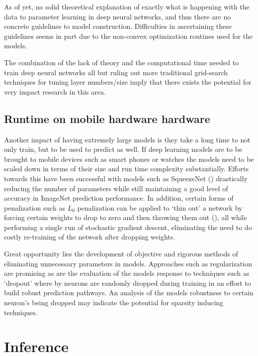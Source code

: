 \documentclass[]{book}
\theoremstyle{definition}
\theoremstyle{definition}
\theoremstyle{definition}
\theoremstyle{remark}
\begin{document}
As of yet, no solid theoretical explanation of exactly what is happening
with the data to parameter learning in deep neural networks, and thus
there are no concrete guidelines to model construction. Difficulties in
ascertaining these guidelines seems in part due to the non-convex
optimization routines used for the models.

The combination of the lack of theory and the computational time needed
to train deep neural networks all but ruling out more traditional
grid-search techniques for tuning layer numbers/size imply that there
exists the potential for very impact research in this area.

\subsection{Runtime on mobile hardware
hardware}\label{runtime-on-mobile-hardware-hardware}

Another impact of having extremely large models is they take a long time
to not only train, but to be used to predict as well. If deep learning
models are to be brought to mobile devices such as smart phones or
watches the models need to be scaled down in terms of their size and run
time complexity substantially. Efforts towards this have been successful
with models such as SqueezeNet (\citet{squeezenet}) drastically reducing
the number of parameters while still maintaining a good level of
accuracy in ImageNet prediction performance. In addition, certain forms
of penalization such as \(L_0\) penalization can be applied to `thin
out' a network by forcing certain weights to drop to zero and then
throwing them out (\citet{sparsenets}), all while performing a single
run of stochastic gradient descent, eliminating the need to do costly
re-training of the network after dropping weights.

Great opportunity lies the development of objective and rigorous methods
of eliminating unnecessary parameters in models. Approaches such as
regularization are promising as are the evaluation of the models
response to techniques such as `dropout' where by neurons are randomly
dropped during training in an effort to build robust prediction
pathways. An analysis of the models robustness to certain neuron's being
dropped may indicate the potential for sparsity inducing techniques.

\section{Inference}\label{inference}
\end{document}
